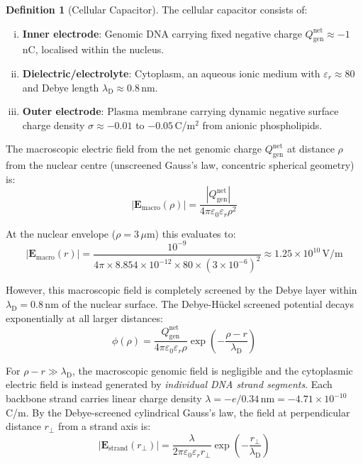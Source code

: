 \documentclass[12pt,a4paper]{article}
\theoremstyle{definition}
\newtheorem{definition}[theorem]{Definition}
\theoremstyle{remark}
\newcommand{\lD}{\lambda_{\mathrm{D}}}
\newcommand{\Qgen}{Q_{\mathrm{gen}}}
\newcommand{\eps}{\varepsilon}
\newcommand{\epsz}{\varepsilon_{0}}
\newcommand{\vv}[1]{\boldsymbol{#1}}
\newcommand{\abs}[1]{\left|#1\right|}
\begin{document}
\begin{definition}[Cellular Capacitor]
The cellular capacitor consists of:
\begin{enumerate}[(i)]
  \item \textbf{Inner electrode}: Genomic DNA carrying fixed negative charge $\Qgen^{\mathrm{net}} \approx -1$\,nC, localised within the nucleus.
  \item \textbf{Dielectric/electrolyte}: Cytoplasm, an aqueous ionic medium with $\eps_r \approx 80$ and Debye length $\lD \approx 0.8$\,nm.
  \item \textbf{Outer electrode}: Plasma membrane carrying dynamic negative surface charge density $\sigma \approx -0.01$ to $-0.05$\,C/m$^2$ from anionic phospholipids.
\end{enumerate}
\end{definition}

The macroscopic electric field from the net genomic charge $\Qgen^{\mathrm{net}}$ at distance $\rho$ from the nuclear centre (unscreened Gauss's law, concentric spherical geometry) is:
\begin{equation}
  \abs{\vv{E}_{\mathrm{macro}}(\rho)} = \frac{\abs{\Qgen^{\mathrm{net}}}}{4\pi \epsz \eps_r \rho^2}
  \label{eq:cytoplasmic_field}
\end{equation}

At the nuclear envelope ($\rho = 3\,\mu$m) this evaluates to:
\begin{equation}
  \abs{\vv{E}_{\mathrm{macro}}(r)} = \frac{10^{-9}}{4\pi \times 8.854 \times 10^{-12} \times 80 \times (3 \times 10^{-6})^2} \approx 1.25 \times 10^{10}\,\mathrm{V/m}
\end{equation}

However, this macroscopic field is completely screened by the Debye layer within $\lD = 0.8$\,nm of the nuclear surface. The Debye-H\"{u}ckel screened potential decays exponentially at all larger distances:
\begin{equation}
  \phi(\rho) = \frac{\Qgen^{\mathrm{net}}}{4\pi \epsz \eps_r \rho} \exp\!\left(-\frac{\rho - r}{\lD}\right)
  \label{eq:screened_potential}
\end{equation}

For $\rho - r \gg \lD$, the macroscopic genomic field is negligible and the cytoplasmic electric field is instead generated by \emph{individual DNA strand segments}. Each backbone strand carries linear charge density $\lambda = -e/0.34\,\mathrm{nm} = -4.71 \times 10^{-10}$\,C/m. By the Debye-screened cylindrical Gauss's law, the field at perpendicular distance $r_\perp$ from a strand axis is:
\begin{equation}
  \abs{\vv{E}_{\mathrm{strand}}(r_\perp)} = \frac{\lambda}{2\pi \epsz \eps_r r_\perp} \exp\!\left(-\frac{r_\perp}{\lD}\right)
  \label{eq:strand_field}
\end{equation}
\end{document}
